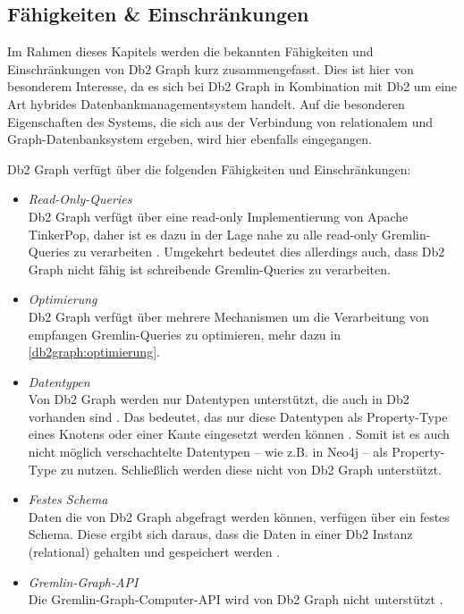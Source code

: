 \subsection{Fähigkeiten \& Einschränkungen}
Im Rahmen dieses Kapitels werden die bekannten Fähigkeiten und Einschränkungen von Db2 Graph kurz zusammengefasst. Dies ist hier von besonderem Interesse, da es sich bei Db2 Graph in Kombination mit Db2 um eine Art hybrides Datenbankmanagementsystem handelt. Auf die besonderen Eigenschaften des Systems, die sich aus der Verbindung von relationalem und Graph-Datenbanksystem ergeben, wird hier ebenfalls eingegangen. 

Db2 Graph verfügt über die folgenden Fähigkeiten und Einschränkungen:

\begin{itemize}
    \item \textit{Read-Only-Queries}\\
    Db2 Graph verfügt über eine read-only Implementierung von Apache TinkerPop, daher ist es dazu in der Lage nahe zu alle read-only Gremlin-Queries zu verarbeiten \cite{ibm_docs_limitiations}. Umgekehrt bedeutet dies allerdings auch, dass Db2 Graph nicht fähig ist schreibende Gremlin-Queries zu verarbeiten.
    \item \textit{Optimierung}\\
    Db2 Graph verfügt über mehrere Mechanismen um die Verarbeitung von empfangen Gremlin-Queries zu optimieren, mehr dazu in \autoref{db2graph:optimierung}.
    \item \textit{Datentypen}\\
    Von Db2 Graph werden nur Datentypen unterstützt, die auch in Db2 vorhanden sind \cite{ibm_docs_limitiations}. Das bedeutet, das nur diese Datentypen als Property-Type eines Knotens oder einer Kante eingesetzt werden können \cite{ibm_docs_limitiations}. Somit ist es auch nicht möglich verschachtelte Datentypen -- wie z.B. in Neo4j -- als Property-Type zu nutzen. Schließlich werden diese nicht von Db2 Graph unterstützt.
    \item \textit{Festes Schema}\\
    Daten die von Db2 Graph abgefragt werden können, verfügen über ein festes Schema. Diese ergibt sich daraus, dass die Daten in einer Db2 Instanz (relational) gehalten und gespeichert werden \cite{sigmod_tian,vldb_tian,yt_tian}.
    \item \textit{Gremlin-Graph-API}\\
    Die Gremlin-Graph-Computer-API wird von Db2 Graph nicht unterstützt \cite{ibm_docs_limitiations}. 
\end{itemize}

